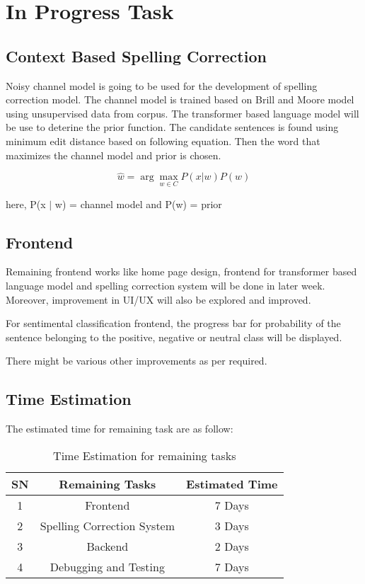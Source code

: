 \chapter{In Progress Task}
\section{Context Based Spelling Correction}
Noisy channel model is going to be used for the development of spelling correction model. The channel model is trained based on Brill and Moore model using unsupervised data from corpus. The transformer based language model will be use to deterine the prior function. The candidate sentences is found using minimum edit distance based on following equation. Then the word that maximizes the channel model and prior is chosen.

\begin{equation}
    \hat{w} = \arg \max_{w \in C} P(x | w) P (w)
\end{equation}

here, P(x $|$ w) = channel model and P(w) = prior

\section{Frontend}
Remaining frontend works like home page design, frontend for transformer based language model and spelling correction system will be done in later week. Moreover, improvement in UI/UX will also be explored and improved.

For sentimental classification frontend, the progress bar for probability of the sentence belonging to the positive, negative or neutral class will be displayed.

There might be various other improvements as per required.

\section{Time Estimation}
The estimated time for remaining task are as follow:

\begin{table}[h]
    \centering
    \begin{tabular}{|c| c| c|}
        \hline
        SN & Remaining Tasks & Estimated Time \\
        \hline
        1 & Frontend & 7 Days \\
        \hline
        2 & Spelling Correction System & 3 Days \\
        \hline
        3 & Backend & 2 Days \\
        \hline
        4 & Debugging and Testing & 7 Days \\
        \hline
    \end{tabular}
    \caption{Time Estimation for remaining tasks}
    \label{tab:Time Estimation for remaining tasks}
\end{table}